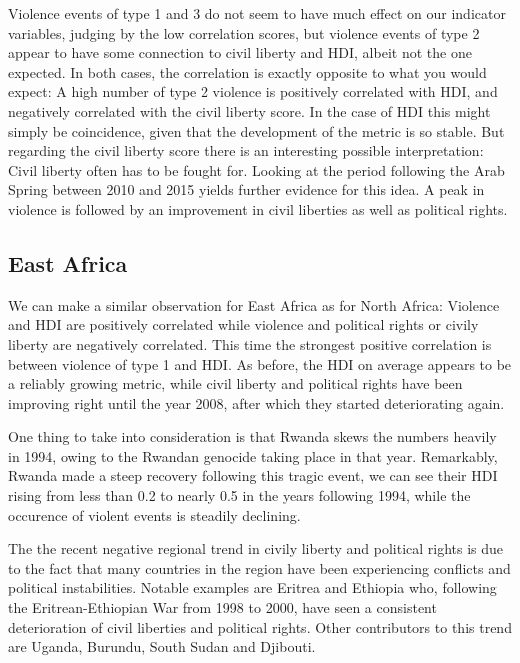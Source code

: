\documentclass[a4paper,11pt]{article}
\begin{document}
Violence events of type 1 and 3 do not seem to have much effect on our indicator variables, judging by the low correlation scores, but violence events of type 2 appear to have some connection to civil liberty and HDI, albeit not the one expected. In both cases, the correlation is exactly opposite to what you would expect: A high number of type 2 violence is positively correlated with HDI, and negatively correlated with the civil liberty score. In the case of HDI this might simply be coincidence, given that the development of the metric is so stable. But regarding the civil liberty score there is an interesting possible interpretation: Civil liberty often has to be fought for. Looking at the period following the Arab Spring between 2010 and 2015 yields further evidence for this idea. A peak in violence is followed by an improvement in civil liberties as well as political rights.

\subsection{East Africa}
We can make a similar observation for East Africa as for North Africa: Violence and HDI are positively correlated while violence and political rights or civily liberty are negatively correlated. This time the strongest positive correlation is between violence of type 1 and HDI\@. As before, the HDI on average appears to be a reliably growing metric, while civil liberty and political rights have been improving right until the year 2008, after which they started deteriorating again.

One thing to take into consideration is that Rwanda skews the numbers heavily in 1994, owing to the Rwandan genocide taking place in that year. Remarkably, Rwanda made a steep recovery following this tragic event, we can see their HDI rising from less than 0.2 to nearly 0.5 in the years following 1994, while the occurence of violent events is steadily declining.

The the recent negative regional trend in civily liberty and political rights is due to the fact that many countries in the region have been experiencing conflicts and political instabilities. Notable examples are Eritrea and Ethiopia who, following the Eritrean-Ethiopian War from 1998 to 2000, have seen a consistent deterioration of civil liberties and political rights. Other contributors to this trend are Uganda, Burundu, South Sudan and Djibouti.
\end{document}
